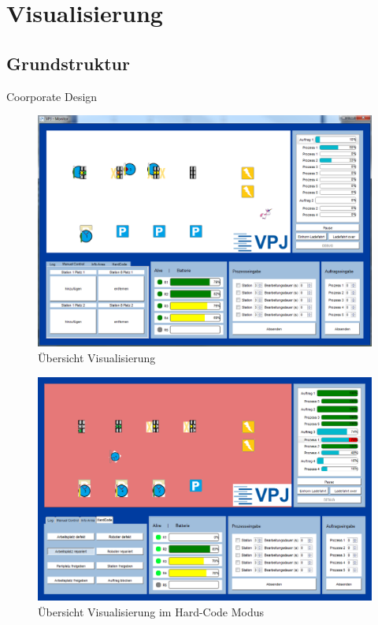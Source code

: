 
\chapter{Visualisierung}
\label{sec:Visualisierung}

\section{Grundstruktur}

Coorporate Design

\begin{figure}[htb]
    \centering
    \includegraphics[width=1\textwidth]{Abbildungen/Gesamtprogramm.png}
    \caption{Übersicht Visualisierung}		
    \label{fig:Gesamtprogramm}
\end{figure}

\begin{figure}[htb]
    \centering
    \includegraphics[width=1\textwidth]{Abbildungen/GesamtprogrammROT.png}
    \caption{Übersicht Visualisierung im Hard-Code Modus}		
    \label{fig:GesamtprogrammROT}
\end{figure}

